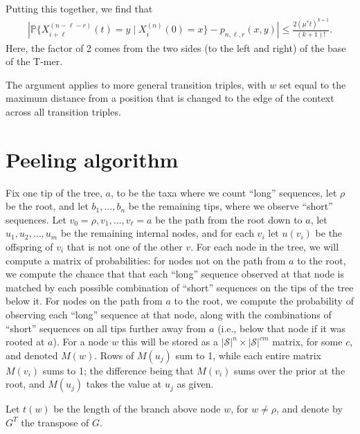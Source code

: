 \documentclass{article}
\renewcommand{\P}{\mathbb{P}}
\newcommand{\calS}{\mathcal{S}}  %
\theoremstyle{plain}
\theoremstyle{definition}
\begin{document}
Putting this together,
we find that
\begin{align*}
    \left|
        \P\{ X_{i+\ell}^{(n-\ell-r)}(t) = y \mid X_i^{(n)}(0) = x \}
        -
        p_{n,\ell,r}(x,y)
    \right|
    \le
    \frac{
        2 (\mu^* t)^{k+1}
    }{
        (k+1)!
    } .
\end{align*}
Here, the factor of 2 comes from the two sides (to the left and right) of the base of the T-mer.

The argument applies to more general transition triples,
with $w$ set equal to the maximum distance
from a position that is changed to the edge of the context
across all transition triples.




\section{Peeling algorithm}
\label{ss:pruning_algorithm}

Fix one tip of the tree, $a$, to be the taxa where we count ``long'' sequences, let $\rho$ be the root, and let $b_1, \ldots, b_n$ be the remaining tips,
where we observe ``short'' sequences.
Let $v_0=\rho, v_1, \ldots, v_\ell = a$ be the path from the root down to $a$,
let $u_1, u_2, \ldots, u_m$ be the remaining internal nodes,
and for each $v_i$ let $u(v_i)$ be the offspring of $v_i$ that is not one of the other $v$.
For each node in the tree,
we will compute a matrix of probabilities:
for nodes not on the path from $a$ to the root,
we compute the chance that that each ``long'' sequence observed at that node
is matched by each possible combination of ``short'' sequences on the tips of the tree below it.
For nodes on the path from $a$ to the root, we compute the probability of observing
each ``long'' sequence at that node, along with the combinations of ``short'' sequences
on all tips further away from $a$ (i.e., below that node if it was rooted at $a$).
For a node $w$ this will be stored as a $|\calS|^{n} \times |\calS|^{cm}$ matrix, for some $c$,
and denoted $M(w)$.
Rows of $M(u_j)$ sum to 1,
while each entire matrix $M(v_i)$ sums to 1;
the difference being that $M(v_i)$ sums over the prior at the root,
and $M(u_j)$ takes the value at $u_j$ as given.

Let $t(w)$ be the length of the branch above node $w$, for $w \neq \rho$,
and denote by $G^T$ the transpose of $G$.
\end{document}
